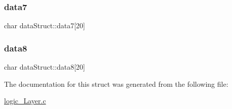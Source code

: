 \mbox{\label{structdata_struct_ac6047dd89e94b7b6e9de7d17d5e3de52}} 
\subsubsection{\texorpdfstring{data7}{data7}}
{\footnotesize\ttfamily char data\+Struct\+::data7\mbox{[}20\mbox{]}}

\mbox{\label{structdata_struct_a2b4485af961a086fb7d678e4d665c5a2}} 
\subsubsection{\texorpdfstring{data8}{data8}}
{\footnotesize\ttfamily char data\+Struct\+::data8\mbox{[}20\mbox{]}}



The documentation for this struct was generated from the following file\+:\begin{DoxyCompactItemize}
\item 
\mbox{\hyperlink{logic___layer_8c}{logic\+\_\+\+Layer.\+c}}\end{DoxyCompactItemize}
